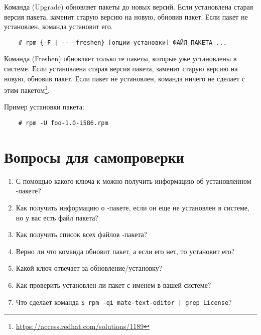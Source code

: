 Команда  (Upgrade) обновляет пакеты до новых версий. Если установлена старая версия пакета,  заменит старую версию на новую, обновив пакет. Если пакет не установлен, команда  установит его.

\begin{verbatim}
    # rpm {-F | ----freshen} [опции-установки] ФАЙЛ_ПАКЕТА ...
\end{verbatim}

Команда  (Freshen) обновляет только те пакеты, которые уже установлены в системе. Если установлена старая версия пакета,  заменит старую версию на новую, обновив пакет. Если пакет не установлен, команда  ничего не сделает с этим пакетом\footnote{\href{https://access.redhat.com/solutions/1189}{https://access.redhat.com/solutions/1189}}.

Пример установки пакета:
\begin{verbatim}
    # rpm -U foo-1.0-i586.rpm
\end{verbatim}


\section{Вопросы для самопроверки}

\begin{enumerate}
	\item С помощью какого ключа к  можно получить информацию об установленном -пакете?
	\item Как получить информацию о -пакете, если он еще не установлен в системе, но у вас есть файл пакета?
	\item Как получить список всех файлов -пакета?
	\item Верно ли что команда  обновит пакет, а если его нет, то установит его?
	\item Какой ключ отвечает за обновление/установку?
	\item Как проверить установлен ли пакет с именем  в вашей системе?
	\item Что сделает команда \verb!$ rpm -qi mate-text-editor | grep License!?
\end{enumerate}

